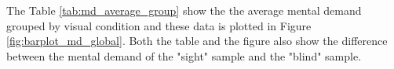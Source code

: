 

%    

The Table \ref{tab:md_average_group} show the the average mental demand grouped by visual condition and these data is plotted in Figure \ref{fig:barplot_md_global}. Both the table and the figure also show the difference between the mental demand of the "sight" sample and the "blind" sample.



%    

